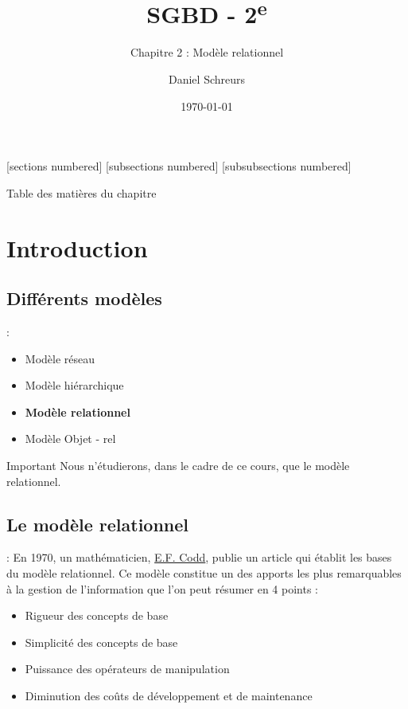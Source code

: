 \documentclass[10pt]{beamer}
\title{SGBD - 2\textsuperscript{e}}
\subtitle{Chapitre 2 : Modèle relationnel}
\date{\today}
\author{Daniel Schreurs}
\institute{Haute École de la Province de Liège}
\begin{document}
\maketitle

[sections numbered]
[subsections numbered]
[subsubsections numbered]
\begin{frame}[allowframebreaks]{Table des matières du chapitre}
    \tableofcontents[subsectionstyle=show/show/hide,subsubsectionstyle=show/show/hide,]
\end{frame}

\section{Introduction}
\tocss

\subsection{Différents modèles}
\begin{frame}{\secname : \subsecname}
    \begin{itemize}
        \item Modèle réseau
        \item Modèle hiérarchique
        \item \textbf{Modèle relationnel}
        \item Modèle Objet - rel
    \end{itemize}
    \begin{alertblock}{Important}
        Nous n'étudierons, dans le cadre de ce cours, que le modèle relationnel.
    \end{alertblock}
\end{frame}

\subsection{Le modèle relationnel}
\begin{frame}{\secname : \subsecname}
    En 1970, un mathématicien, \href{https://fr.wikipedia.org/wiki/Edgar_Frank_Codd}{E.F. Codd}, publie un article qui établit les bases du modèle relationnel.
    Ce modèle constitue un des apports les plus remarquables à la gestion de l’information que l’on peut résumer en 4 points :
    \begin{itemize}
        \item Rigueur des concepts de base
        \item Simplicité des concepts de base
        \item Puissance des opérateurs de manipulation
        \item Diminution des coûts de développement et de maintenance
    \end{itemize}
\end{frame}
\end{document}
